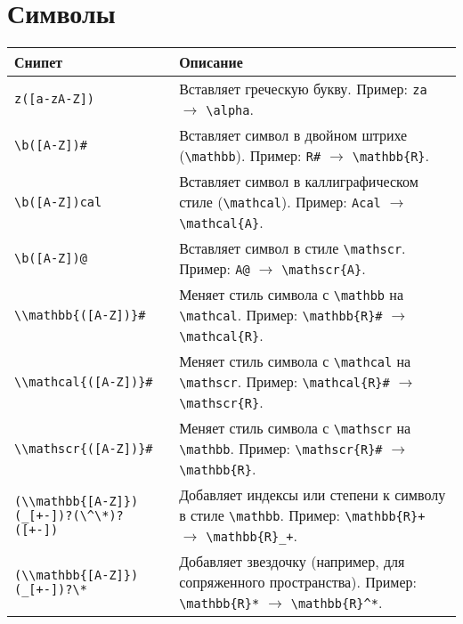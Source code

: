 \documentclass[a4paper]{article}
\begin{document}
\section{Символы}
\begin{longtable}{|p{5cm}|p{10cm}|}
    \hline
    \textbf{Снипет} & \textbf{Описание} \\
    \hline
    \verb|z([a-zA-Z])| & Вставляет греческую букву. Пример: \verb|za| $\rightarrow$ \verb|\alpha|. \\
    \hline
    \verb|\b([A-Z])#| & Вставляет символ в двойном штрихе (\verb|\mathbb|). Пример: \verb|R#| $\rightarrow$ \verb|\mathbb{R}|. \\
    \hline
    \verb|\b([A-Z])cal| & Вставляет символ в каллиграфическом стиле (\verb|\mathcal|). Пример: \verb|Acal| $\rightarrow$ \verb|\mathcal{A}|. \\
    \hline
    \verb|\b([A-Z])@| & Вставляет символ в стиле \verb|\mathscr|. Пример: \verb|A@| $\rightarrow$ \verb|\mathscr{A}|. \\
    \hline
    \verb|\\mathbb{([A-Z])}#| & Меняет стиль символа с \verb|\mathbb| на \verb|\mathcal|. Пример: \verb|\mathbb{R}#| $\rightarrow$ \verb|\mathcal{R}|. \\
    \hline
    \verb|\\mathcal{([A-Z])}#| & Меняет стиль символа с \verb|\mathcal| на \verb|\mathscr|. Пример: \verb|\mathcal{R}#| $\rightarrow$ \verb|\mathscr{R}|. \\
    \hline
    \verb|\\mathscr{([A-Z])}#| & Меняет стиль символа с \verb|\mathscr| на \verb|\mathbb|. Пример: \verb|\mathscr{R}#| $\rightarrow$ \verb|\mathbb{R}|. \\
    \hline
    \verb|(\\mathbb{[A-Z]})(_[+-])?(\^\*)?([+-])| & Добавляет индексы или степени к символу в стиле \verb|\mathbb|. Пример: \verb|\mathbb{R}+| $\rightarrow$ \verb|\mathbb{R}_+|. \\
    \hline
    \verb|(\\mathbb{[A-Z]})(_[+-])?\*| & Добавляет звездочку (например, для сопряженного пространства). Пример: \verb|\mathbb{R}*| $\rightarrow$ \verb|\mathbb{R}^*|. \\
    \hline
\end{longtable}
\newpage
\end{document}
